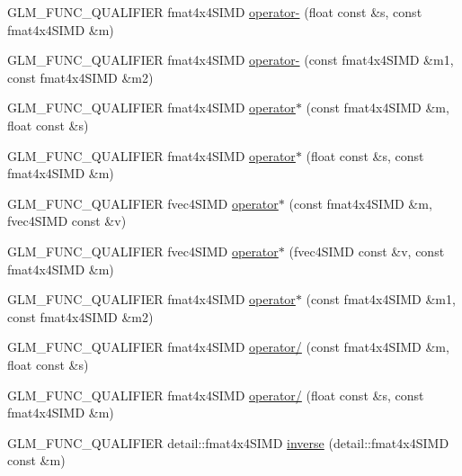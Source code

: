 \begin{DoxyCompactItemize}
\item 
G\+L\+M\+\_\+\+F\+U\+N\+C\+\_\+\+Q\+U\+A\+L\+I\+F\+I\+E\+R fmat4x4\+S\+I\+M\+D \hyperlink{namespaceglm_1_1detail_a470e32d5d0337f7714ecb8c8c9ad368d}{operator-\/} (float const \&s, const fmat4x4\+S\+I\+M\+D \&m)
\item 
G\+L\+M\+\_\+\+F\+U\+N\+C\+\_\+\+Q\+U\+A\+L\+I\+F\+I\+E\+R fmat4x4\+S\+I\+M\+D \hyperlink{namespaceglm_1_1detail_a00972f91f088e7ab0f96ebdc6e8bec41}{operator-\/} (const fmat4x4\+S\+I\+M\+D \&m1, const fmat4x4\+S\+I\+M\+D \&m2)
\item 
G\+L\+M\+\_\+\+F\+U\+N\+C\+\_\+\+Q\+U\+A\+L\+I\+F\+I\+E\+R fmat4x4\+S\+I\+M\+D \hyperlink{namespaceglm_1_1detail_a56fc3932025be61fb9a7cb14005c0d00}{operator$\ast$} (const fmat4x4\+S\+I\+M\+D \&m, float const \&s)
\item 
G\+L\+M\+\_\+\+F\+U\+N\+C\+\_\+\+Q\+U\+A\+L\+I\+F\+I\+E\+R fmat4x4\+S\+I\+M\+D \hyperlink{namespaceglm_1_1detail_a8ab387a0948c211143bbb41dd8fda30c}{operator$\ast$} (float const \&s, const fmat4x4\+S\+I\+M\+D \&m)
\item 
G\+L\+M\+\_\+\+F\+U\+N\+C\+\_\+\+Q\+U\+A\+L\+I\+F\+I\+E\+R fvec4\+S\+I\+M\+D \hyperlink{namespaceglm_1_1detail_a8ba6a9d268faa4277d6734a2da036c4d}{operator$\ast$} (const fmat4x4\+S\+I\+M\+D \&m, fvec4\+S\+I\+M\+D const \&v)
\item 
G\+L\+M\+\_\+\+F\+U\+N\+C\+\_\+\+Q\+U\+A\+L\+I\+F\+I\+E\+R fvec4\+S\+I\+M\+D \hyperlink{namespaceglm_1_1detail_a0f6596e928f7dc3fb62a38bb5df08d18}{operator$\ast$} (fvec4\+S\+I\+M\+D const \&v, const fmat4x4\+S\+I\+M\+D \&m)
\item 
G\+L\+M\+\_\+\+F\+U\+N\+C\+\_\+\+Q\+U\+A\+L\+I\+F\+I\+E\+R fmat4x4\+S\+I\+M\+D \hyperlink{namespaceglm_1_1detail_a628d3f0d2c16d6207ca18a11ad66261c}{operator$\ast$} (const fmat4x4\+S\+I\+M\+D \&m1, const fmat4x4\+S\+I\+M\+D \&m2)
\item 
G\+L\+M\+\_\+\+F\+U\+N\+C\+\_\+\+Q\+U\+A\+L\+I\+F\+I\+E\+R fmat4x4\+S\+I\+M\+D \hyperlink{namespaceglm_1_1detail_aa8f3ac302faac4a9d5c0e49321ccf9cb}{operator/} (const fmat4x4\+S\+I\+M\+D \&m, float const \&s)
\item 
G\+L\+M\+\_\+\+F\+U\+N\+C\+\_\+\+Q\+U\+A\+L\+I\+F\+I\+E\+R fmat4x4\+S\+I\+M\+D \hyperlink{namespaceglm_1_1detail_a33235564824caa327d104e227bc64045}{operator/} (float const \&s, const fmat4x4\+S\+I\+M\+D \&m)
\item 
G\+L\+M\+\_\+\+F\+U\+N\+C\+\_\+\+Q\+U\+A\+L\+I\+F\+I\+E\+R detail\+::fmat4x4\+S\+I\+M\+D \hyperlink{namespaceglm_1_1detail_a4d5c895b3548f6c8296fd6a9980fe3e1}{inverse} (detail\+::fmat4x4\+S\+I\+M\+D const \&m)

\end{DoxyCompactItemize}
